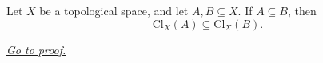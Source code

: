 \begin{lemma}
\label{lem:topological-closure-monotone}
Let \(X\) be a topological space, and let \(A,B\subseteq X\).  If
\(A\subseteq B\), then
\[
\mathrm{Cl}_{X}(A)\subseteq\mathrm{Cl}_{X}(B).
\]

\smallskip
\noindent
\hyperref[prf:topological-closure-monotone]{\textit{Go to proof.}}
\end{lemma}